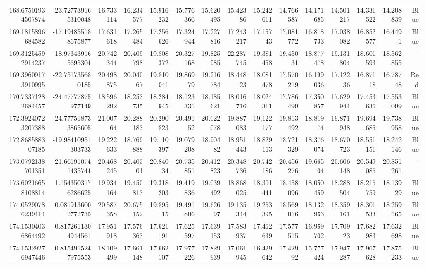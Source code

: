 \begin{center}
\begin{longtable}{rrrrrrrrrrrrrrr}
168.67501934507874 & -23.727739165310048 & 16.733114 & 16.234577 & 15.916232 & 15.776366 & 15.620495 & 15.42386 & 15.242611 & 14.766587 & 14.171685 & 14.501217 & 14.331522 & 14.208839 & Blue \\
169.1815896684582 & -17.194855188675877 & 17.631618 & 17.265484 & 17.256626 & 17.324944 & 17.227816 & 17.243217 & 17.15743 & 17.081772 & 16.818733 & 17.038082 & 16.852577 & 16.4491 & Blue \\
169.31254592914237 & -18.973439165695304 & 20.742344 & 20.409798 & 19.808372 & 20.327168 & 19.825985 & 22.287745 & 19.381458 & 19.45031 & 18.877478 & 19.131804 & 18.601593 & 18.562855 & - \\
169.39609173910995 & -22.751735680185 & 20.498875 & 20.04067 & 19.810041 & 19.86979 & 19.216784 & 18.44823 & 18.081478 & 17.570219 & 16.199036 & 17.12236 & 16.87118 & 16.78748 & Red \\
170.73371282684457 & -24.47777875977149 & 18.596292 & 18.253735 & 18.284945 & 18.123331 & 18.185621 & 18.016716 & 18.024311 & 17.786499 & 17.350857 & 17.629944 & 17.453636 & 17.553099 & Blue \\
172.39240723207388 & -24.777518733865605 & 21.00764 & 20.288183 & 20.290823 & 20.49152 & 20.022078 & 19.887083 & 19.122177 & 19.813492 & 18.81974 & 19.871948 & 19.694685 & 19.738958 & Blue \\
172.868588307185 & -19.98410951303733 & 19.222633 & 18.769888 & 19.110397 & 19.079208 & 18.90482 & 18.951443 & 18.829163 & 18.721329 & 18.376074 & 18.670723 & 18.551151 & 18.242146 & Blue \\
173.0792138701351 & -21.661910741435744 & 20.468245 & 20.40301 & 20.84034 & 20.735851 & 20.412823 & 20.348736 & 20.742186 & 20.456276 & 19.66504 & 20.606148 & 20.549086 & 20.851261 & - \\
173.60216658108814 & 1.1543503176286625 & 19.934164 & 19.450813 & 19.318203 & 19.419836 & 19.039492 & 18.868025 & 18.301441 & 18.458096 & 18.050459 & 18.288504 & 18.216759 & 18.13929 & Blue \\
174.05290786239414 & 0.0819136002772735 & 20.587358 & 20.675152 & 19.89515 & 19.491806 & 19.62697 & 19.135344 & 19.263395 & 18.569016 & 18.132963 & 18.359161 & 18.301533 & 18.259165 & Blue \\
174.15304036864492 & 0.8172611304944561 & 17.951918 & 17.576363 & 17.621191 & 17.625597 & 17.639153 & 17.583937 & 17.462639 & 17.577515 & 16.969702 & 17.70923 & 17.682983 & 17.632698 & Blue \\
174.15329276947446 & 0.8154915247975553 & 18.109499 & 17.661148 & 17.662107 & 17.977226 & 17.829939 & 17.061945 & 16.429642 & 17.42992 & 15.777424 & 17.947287 & 17.967628 & 17.875233 & Blue \\

\end{longtable}
\end{center}
